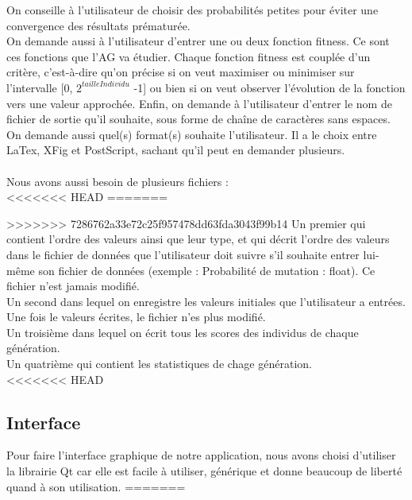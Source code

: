 \documentclass[a4paper,11pt]{article}
\begin{document}
		On conseille à l’utilisateur de choisir des probabilités petites pour éviter une convergence des résultats prématurée.\\
		On demande aussi à l’utilisateur d’entrer une ou deux fonction fitness.
		Ce sont ces fonctions que l’AG va étudier.
		Chaque fonction fitness est couplée d’un critère, c’est-à-dire qu’on précise si on veut maximiser ou minimiser sur l’intervalle [0, $2^{tailleIndividu}$ -1] ou bien si on veut observer l’évolution de la fonction vers une valeur approchée.
		Enfin, on demande à l’utilisateur d’entrer le nom de fichier de sortie qu’il souhaite, sous forme de chaîne de caractères sans espaces.
		On demande aussi quel(s) format(s) souhaite l’utilisateur.
		Il a le choix entre LaTex, XFig et PostScript, sachant qu’il peut en demander plusieurs.\\
		\\
		Nous avons aussi besoin de plusieurs fichiers :\\
<<<<<<< HEAD
=======

>>>>>>> 7286762a33e72c25f957478dd63fda3043f99b14
		Un premier qui contient l’ordre des valeurs ainsi que leur type, et qui décrit l'ordre des valeurs dans le fichier de données que l'utilisateur doit suivre s'il souhaite entrer lui-même son fichier de données (exemple : Probabilité de mutation : float). Ce fichier n'est jamais modifié.\\
		Un second dans lequel on enregistre les valeurs initiales que l'utilisateur a entrées. Une fois le valeurs écrites, le fichier n'es plus modifié.\\
		Un troisième dans lequel on écrit tous les scores des individus de chaque génération.\\
		Un quatrième qui contient les statistiques de chage génération.\\
<<<<<<< HEAD
		
		\subsection{Interface}
			Pour faire l'interface graphique de notre application, nous avons choisi d'utiliser la librairie Qt car elle est facile à utiliser, générique et donne beaucoup de liberté quand à son utilisation. 
=======
		
\end{document}
